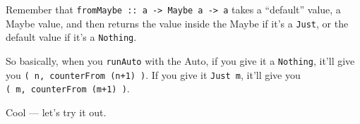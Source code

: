 \documentclass[]{article}
\newenvironment{Shaded}{}{}
\newcommand{\CommentTok}[1]{\textcolor[rgb]{0.38,0.63,0.69}{\textit{#1}}}
\newcommand{\DataTypeTok}[1]{\textcolor[rgb]{0.56,0.13,0.00}{#1}}
\newcommand{\DecValTok}[1]{\textcolor[rgb]{0.25,0.63,0.44}{#1}}
\newcommand{\KeywordTok}[1]{\textcolor[rgb]{0.00,0.44,0.13}{\textbf{#1}}}
\newcommand{\NormalTok}[1]{#1}
\newcommand{\OperatorTok}[1]{\textcolor[rgb]{0.40,0.40,0.40}{#1}}
\newcommand{\OtherTok}[1]{\textcolor[rgb]{0.00,0.44,0.13}{#1}}
\begin{document}
\begin{Shaded}
\end{Shaded}

Remember that
\texttt{fromMaybe\ ::\ a\ -\textgreater{}\ Maybe\ a\ -\textgreater{}\ a} takes a
``default'' value, a Maybe value, and then returns the value inside the Maybe if
it's a \texttt{Just}, or the default value if it's a \texttt{Nothing}.

So basically, when you \texttt{runAuto} with the Auto, if you give it a
\texttt{Nothing}, it'll give you \texttt{(\ n,\ counterFrom\ (n+1)\ )}. If you
give it \texttt{Just\ m}, it'll give you \texttt{(\ m,\ counterFrom\ (m+1)\ )}.

Cool --- let's try it out.
\end{document}
